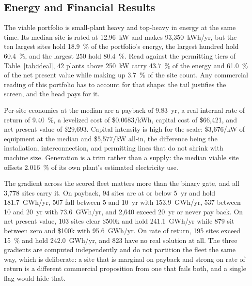\documentclass[12pt,letterpaper]{report}
\begin{document}
\subsection{Energy and Financial Results}                %

The viable portfolio is small-plant heavy and top-heavy in energy at the same
time. Its median site is rated at 12.96~kW and makes 93{,}350~kWh/yr, but the ten
largest sites hold 18.9~\% of the portfolio's energy, the largest hundred hold
60.4~\%, and the largest 250 hold 80.4~\%. Read against the permitting tiers of
Table~\ref{tab:ideal}, 42 plants above 250~kW carry 43.7~\% of the energy and
61.0~\% of the net present value while making up 3.7~\% of the site count. Any
commercial reading of this portfolio has to account for that shape: the tail
justifies the screen, and the head pays for it.

Per-site economics at the median are a payback of 9.83~yr, a real internal rate of
return of 9.40~\%, a levelized cost of \$0.0683/kWh, capital cost of \$66{,}421,
and net present value of \$29{,}693. Capital intensity is high for the scale:
\$3{,}676/kW of equipment at the median and \$5{,}577/kW all-in, the difference
being the installation, interconnection, and permitting lines that do not shrink
with machine size. Generation is a trim rather than a supply: the median viable
site offsets 2.016~\% of its own plant's estimated electricity use.

The gradient across the scored fleet matters more than the binary gate, and all
3{,}778 sites carry it. On payback, 94 sites are at or below 5~yr and hold
181.7~GWh/yr, 507 fall between 5 and 10~yr with 153.9~GWh/yr, 537 between 10 and
20~yr with 73.6~GWh/yr, and 2{,}640 exceed 20~yr or never pay back. On net present
value, 103 sites clear \$500k and hold 241.1~GWh/yr while 879 sit between zero and
\$100k with 95.6~GWh/yr. On rate of return, 195 sites exceed 15~\% and hold
242.0~GWh/yr, and 823 have no real solution at all. The three gradients are
computed independently and do not partition the fleet the same way, which is
deliberate: a site that is marginal on payback and strong on rate of return is a
different commercial proposition from one that fails both, and a single flag would
hide that.
\end{document}
